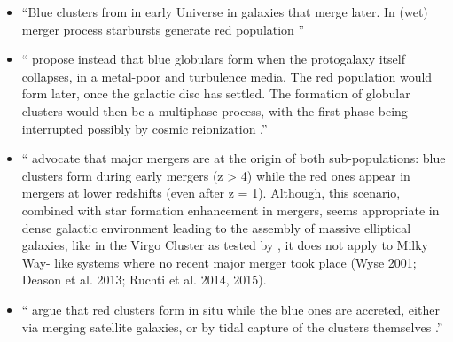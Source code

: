 \documentclass[a4paper,fleqn,usenatbib]{mnras}
\begin{document}
\begin{itemize}
    \item ``Blue clusters from in early Universe in galaxies that merge later. In (wet) merger process starbursts generate red population \cite{1992ApJ...384...50A, 1987nngp.proc...18S}''
    \item ``\citet{1997AJ....113.1652F} propose instead that blue globulars form when the protogalaxy itself collapses, in a metal-poor and turbulence media. The red population would form later, once the galactic disc has settled. The formation of globular clusters would then be a multiphase process, with the first phase being interrupted possibly by cosmic reionization \citep{2002MNRAS.333..383B}.''
    \item ``\citet{2005ApJ...623..650K, 2014ApJ...796...10L} advocate
that major mergers are at the origin of both sub-populations: blue
clusters form during early mergers (z > 4) while the red ones appear
in mergers at lower redshifts (even after z = 1). Although, this
scenario, combined with star formation enhancement in mergers,
seems appropriate in dense galactic environment leading to the
assembly of massive elliptical galaxies, like in the Virgo Cluster
as tested by \citet{2014ApJ...796...10L}, it does not apply to Milky Way-
like systems where no recent major merger took place (Wyse 2001;
Deason et al. 2013; Ruchti et al. 2014, 2015).
\item ``\citet{1998ApJ...501..554C} argue that red clusters form in situ while the blue ones are accreted, either via merging satellite galaxies, or by tidal capture of the clusters themselves \citep[see also][]{2013ApJ...762...39T}.''
\end{itemize}
\end{document}
